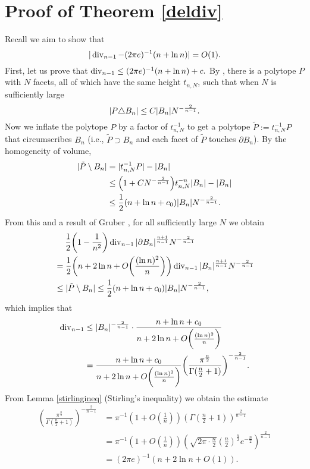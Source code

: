 \section{Proof of Theorem \ref{deldiv}}
Recall  we aim to show that 
\[
|\operatorname{div}_{n-1} - (2\pi e)^{-1}(n+\ln n)| =O(1).
\]
First, let us prove that  $\operatorname{div}_{n-1} \leq (2\pi e)^{-1}(n+\ln n) + c.$  By \cite[Theorem 2.1]{kur2017approximation}, there is a polytope $ P $ with $ N $ facets, all of which have the same height $ t_{n,N} $, such that when $N$ is sufficiently large
\[
|P \triangle B_n| \leq C|B_n|N^{-\frac 2{n-1}}.
\]
Now we inflate the polytope $P$ by a factor of $ t_{n,N}^{-1} $ to get a polytope $\tilde P:=t_{n,N}^{-1}P$ that circumscribes $B_n$ (i.e., $\tilde P\supset B_n$ and each facet of $\tilde P$ touches $\partial B_n$). By the homogeneity of volume,
\begin{align*}
|\tilde{P} \setminus B_n|&=|t_{n,N}^{-1}P| - |B_n|\\
& \leq \left(1+C\NN\right)t_{n,N}^{-n}|B_n|-|B_n|\\
& \leq\frac{1}{2}(n+\ln n+c_{0})|B_n|\NN.
\end{align*}
From this and a result of Gruber \cite[Eq. (4)]{GruberOut}, for all sufficiently large  $N$  we obtain
\begin{align*}
&\phantom{=}\,\,\,\frac{1}{2}\left(1-\frac{1}{n^2}\right)\divv_{n-1}|\partial B_n|^{\frac{n+1}{n-1}}\NN\\
&=\frac{1}{2}\left(n+2\ln n +O\bigg(\frac{(\ln n)^2}{n}\bigg)\right)\divv_{n-1}|B_n|^{\frac{n+1}{n-1}}\NN
\\& \leq |\tilde P\setminus B_n| \leq \frac{1}{2}(n+\ln n+c_0)|B_n|\NN,
\end{align*}which implies that
\begin{align}\label{ballvolume1}
\divv_{n-1} &\leq |B_n|^{-\frac{2}{n-1}}\cdot\frac{n+\ln n+c_0}{n+2\ln n +O\bigg(\frac{(\ln n)^2}{n}\bigg)}\nonumber
\\&=
\frac{n+\ln n+c_0}{n+2\ln n +O\bigg(\frac{(\ln n)^2}{n}\bigg)}\left(\frac{{\pi}^{\frac{n}{2}}}{\Gamma(\frac{n}{2}+1)}\right)^{-\frac{2}{n-1}}.
\end{align}
From Lemma \ref{stirlingineq} (Stirling's inequality) we obtain the estimate
\begin{align}\label{ballvolume2}
\left(\frac{{\pi}^{\frac{n}{2}}}{\Gamma(\frac{n}{2}+1)}\right)^{-\frac{2}{n-1}} &= \pi^{-1}(1+O(\tfrac{1}{n}))\left(\Gamma\left(\frac{n}{2}+1\right)\right)^{\frac{2}{n-1}} \nonumber\\
&=\pi^{-1}(1+O(\tfrac{1}{n}))\left(\sqrt{2\pi\cdot\frac{n}{2}}\left(\frac{n}{2}\right)^{\frac{n}{2}}e^{-\frac{n}{2}}\right)^{\frac{2}{n-1}}\nonumber\\
&=(2\pi e)^{-1}(n+2\ln n+O(1)).
\end{align}
